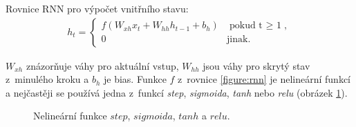 Rovnice RNN pro výpočet vnitřního stavu:
\begin{align}\label{figure:rnn}
  h_t = \begin{cases}
          f(W_{xh}x_t + W_{hh}h_{t-1} + b_h) & \mbox{pokud t $\geq$ 1}, \\
          0 & \mbox{jinak}.
        \end{cases}
\end{align}


$W_{xh}$ znázorňuje váhy pro aktuální vstup, $W_{hh}$ jsou váhy pro skrytý stav z~minulého kroku a $b_h$ je bias. Funkce $f$ z~rovnice \ref{figure:rnn} je nelineární funkcí a nejčastěji se používá jedna z~funkcí \emph{step}, \emph{sigmoida}, \emph{tanh} nebo \emph{relu} (obrázek \ref{img:functions}).

\begin{figure}[H]
    \begin{center}
    \end{center}
	\caption{Nelineární funkce $step$, $sigmoida$, $tanh$ a $relu$.}
	\label{img:functions}
\end{figure}

